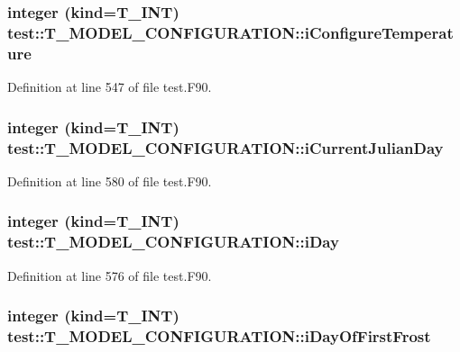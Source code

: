 \hypertarget{typetest_1_1_t___m_o_d_e_l___c_o_n_f_i_g_u_r_a_t_i_o_n_ae5530d148a3320fb1ae12169468bea41}{
\subsubsection[{iConfigureTemperature}]{\setlength{\rightskip}{0pt plus 5cm}integer (kind={\bf T\_\-INT}) {\bf test::T\_\-MODEL\_\-CONFIGURATION::iConfigureTemperature}}}
\label{typetest_1_1_t___m_o_d_e_l___c_o_n_f_i_g_u_r_a_t_i_o_n_ae5530d148a3320fb1ae12169468bea41}


Definition at line 547 of file test.F90.

\hypertarget{typetest_1_1_t___m_o_d_e_l___c_o_n_f_i_g_u_r_a_t_i_o_n_a0d100f6b26ab499a54097cca3828f266}{
\subsubsection[{iCurrentJulianDay}]{\setlength{\rightskip}{0pt plus 5cm}integer (kind={\bf T\_\-INT}) {\bf test::T\_\-MODEL\_\-CONFIGURATION::iCurrentJulianDay}}}
\label{typetest_1_1_t___m_o_d_e_l___c_o_n_f_i_g_u_r_a_t_i_o_n_a0d100f6b26ab499a54097cca3828f266}


Definition at line 580 of file test.F90.

\hypertarget{typetest_1_1_t___m_o_d_e_l___c_o_n_f_i_g_u_r_a_t_i_o_n_acbaa378dccabd89a4d13129e2c548146}{
\subsubsection[{iDay}]{\setlength{\rightskip}{0pt plus 5cm}integer (kind={\bf T\_\-INT}) {\bf test::T\_\-MODEL\_\-CONFIGURATION::iDay}}}
\label{typetest_1_1_t___m_o_d_e_l___c_o_n_f_i_g_u_r_a_t_i_o_n_acbaa378dccabd89a4d13129e2c548146}


Definition at line 576 of file test.F90.

\hypertarget{typetest_1_1_t___m_o_d_e_l___c_o_n_f_i_g_u_r_a_t_i_o_n_a4991a7ccab48fa46d5afc6e378e66379}{
\subsubsection[{iDayOfFirstFrost}]{\setlength{\rightskip}{0pt plus 5cm}integer (kind={\bf T\_\-INT}) {\bf test::T\_\-MODEL\_\-CONFIGURATION::iDayOfFirstFrost}}}
\label{typetest_1_1_t___m_o_d_e_l___c_o_n_f_i_g_u_r_a_t_i_o_n_a4991a7ccab48fa46d5afc6e378e66379}


